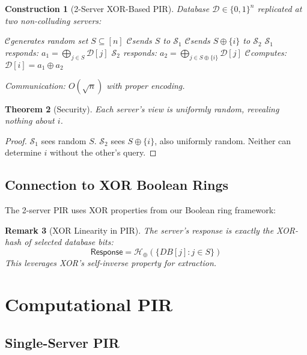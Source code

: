 \documentclass[11pt,final]{article}
\newcommand{\DB}{\mathcal{D}}
\newcommand{\Response}{\mathsf{Response}}
\newcommand{\Server}{\ensuremath{\mathcal{S}}}
\newcommand{\Client}{\ensuremath{\mathcal{C}}}
\newcommand{\XOR}{\oplus}
\newcommand{\HashXOR}[1]{\mathcal{H}_{\XOR}(#1)}
\newtheorem{theorem}{Theorem}[section]
\newtheorem{remark}[theorem]{Remark}
\newtheorem{construction}[theorem]{Construction}
\begin{document}
\begin{construction}[2-Server XOR-Based PIR]
Database $\DB \in \{0,1\}^n$ replicated at two non-colluding servers:
\begin{algorithm}[H]
\caption{2-Server PIR Protocol}
\KwOut{Bit $\DB[i]$}
\Client generates random set $S \subseteq [n]$\;
\Client sends $S$ to $\Server_1$\;
\Client sends $S \oplus \{i\}$ to $\Server_2$\;
$\Server_1$ responds: $a_1 = \bigoplus_{j \in S} \DB[j]$\;
$\Server_2$ responds: $a_2 = \bigoplus_{j \in S \oplus \{i\}} \DB[j]$\;
\Client computes: $\DB[i] = a_1 \oplus a_2$\;
\end{algorithm}
Communication: $O(\sqrt{n})$ with proper encoding.
\end{construction}

\begin{theorem}[Security]
Each server's view is uniformly random, revealing nothing about $i$.
\end{theorem}

\begin{proof}
$\Server_1$ sees random $S$. $\Server_2$ sees $S \oplus \{i\}$, also uniformly random.
Neither can determine $i$ without the other's query.
\end{proof}

\subsection{Connection to XOR Boolean Rings}

The 2-server PIR uses XOR properties from our Boolean ring framework:

\begin{remark}[XOR Linearity in PIR]
The server's response is exactly the XOR-hash of selected database bits:
\begin{equation}
\Response = \HashXOR{\{DB[j] : j \in S\}}
\end{equation}
This leverages XOR's self-inverse property for extraction.
\end{remark}

\section{Computational PIR}

\subsection{Single-Server PIR}
\end{document}
